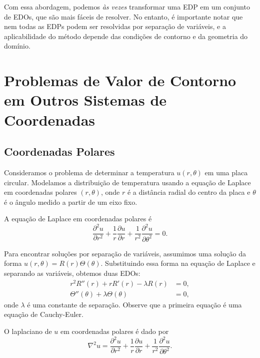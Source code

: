 \documentclass{article}
\begin{document}
Com essa abordagem, podemos \emph{às vezes} transformar uma EDP em um conjunto de EDOs, que são mais fáceis de resolver. No entanto, é importante notar que nem todas as EDPs podem ser resolvidas por separação de variáveis, e a aplicabilidade do método depende das condições de contorno e da geometria do domínio.

\section{Problemas de Valor de Contorno em Outros Sistemas de Coordenadas}

\subsection{Coordenadas Polares}

Consideramos o problema de determinar a temperatura \(u(r, \theta)\) em uma placa circular. Modelamos a distribuição de temperatura usando a equação de Laplace em coordenadas polares \((r, \theta)\), onde \(r\) é a distância radial do centro da placa e \(\theta\) é o ângulo medido a partir de um eixo fixo.

A equação de Laplace em coordenadas polares é
    \begin{equation}
        \frac{\partial^2 u}{\partial r^2} + \frac{1}{r} \frac{\partial u}{\partial r} + \frac{1}{r^2} \frac{\partial^2 u}{\partial \theta^2} = 0.
    \end{equation}

Para encontrar soluções por separação de variáveis, assumimos uma solução da forma \(u(r,\theta) = R(r)\Theta(\theta)\). Substituindo essa forma na equação de Laplace e separando as variáveis, obtemos duas EDOs:
    \begin{align}
        r^2 R''(r) + r R'(r) - \lambda R(r) &= 0, \\
        \Theta''(\theta) + \lambda \Theta(\theta) &= 0,
    \end{align}
onde \(\lambda\) é uma constante de separação. Observe que a primeira equação é uma equação de Cauchy-Euler.

\begin{rem}
    O laplaciano de \(u\) em coordenadas polares é dado por
    \begin{equation}
        \nabla^2 u = \frac{\partial^2 u}{\partial r^2} + \frac{1}{r} \frac{\partial u}{\partial r} + \frac{1}{r^2} \frac{\partial^2 u}{\partial \theta^2}.
    \end{equation}
\end{rem}
\end{document}
